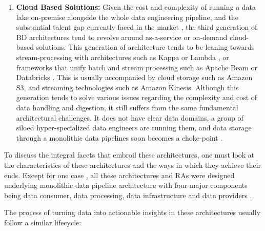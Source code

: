 \documentclass[review]{elsarticle}
\begin{document}
\begin{enumerate}
    \item \textbf{Cloud Based Solutions:} Given the cost and complexity of running a data lake on-premise alongside the whole data engineering pipeline, and the substantial talent gap currently faced in the market \cite{AtaeiHype}, the third generation of BD architectures tend to revolve around as-a-service or on-demand cloud-based solutions. This generation of architecture tends to be leaning towards stream-processing with architectures such as Kappa or Lambda \cite{lin2017lambda}, or frameworks that unify batch and stream processing such as Apache Beam \cite{ApachBeam} or Databricks \cite{DataBricks}. This is usually accompanied by cloud storage such as Amazon S3, and streaming technologies such as Amazon Kinesis. Although this generation tends to solve various issues regarding the complexity and cost of data handling and digestion, it still suffers from the same fundamental architectural challenges. It does not have clear data domains, a group of siloed hyper-specialized data engineers are running them, and data storage through a monolithic data pipelines soon becomes a choke-point \cite{AtaeiACIS, ataei2023application}.
\end{enumerate}

To discuss the integral facets that embroil these architectures, one must look at the characteristics of these architectures and the ways in which they achieve their ends. Except for one case \cite{AtaeiApsec}, all these architectures and RAs were designed underlying monolithic data pipeline architecture with four major components being data consumer, data processing, data infrastructure and data providers \cite{ataei2022state}.

The process of turning data into actionable insights in these architectures usually follow a similar lifecycle:
\end{document}
